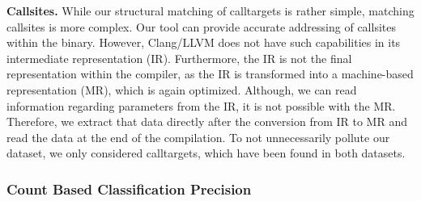 \textbf{Callsites.} While our structural matching of calltargets is rather simple, matching callsites is more complex. Our tool can provide accurate addressing of 
callsites within the binary. However, Clang/LLVM does not have such capabilities in its intermediate representation (IR). Furthermore, the IR is not the final representation within
the compiler, as the IR is transformed into a machine-based representation (MR), which is again optimized. Although, we can read information regarding parameters from the IR, it 
is not possible with the MR. Therefore, we extract that data directly after the conversion from IR to MR and read the data at the end of the compilation. To not unnecessarily 
pollute our dataset, we only considered calltargets, which have been found in both datasets. 


\subsubsection{Count Based Classification Precision}
\label{subsection:typeshieldcountprecision}

